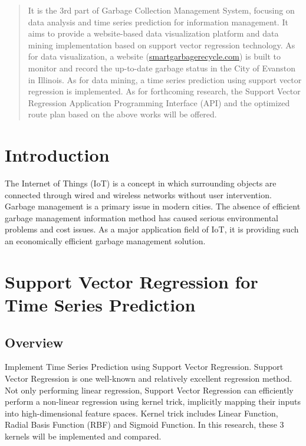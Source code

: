\documentclass[a0b,portrait]{a0poster}
\begin{document}
\begin{multicols}{3} %

\color{Navy} %

\begin{abstract}
\noindent{}It is the 3rd part of Garbage Collection Management System, focusing on data analysis and time series prediction for information management. It aims to provide a website-based data visualization platform and data mining implementation based on support vector regression technology. As for data visualization, a website (\href{http://smartgarbagerecycle.com/}{smartgarbagerecycle.com}) is built to monitor and record the up-to-date garbage status in the City of Evanston in Illinois. As for data mining, a time series prediction using support vector regression is implemented. As for forthcoming research, the Support Vector Regression Application Programming Interface (API) and the optimized route plan based on the above works will be offered.
\end{abstract}

\color{Black} %

\section*{Introduction}
The Internet of Things (IoT) is a concept in which surrounding objects are connected through wired and wireless networks without user intervention. Garbage management is a primary issue in modern cities. The absence of efficient garbage management information method has caused serious environmental problems and cost issues. As a major application field of IoT, it is providing such an economically efficient garbage management solution.

\color{Black} %
\section*{Support Vector Regression for Time Series Prediction}
\subsection*{Overview}
Implement Time Series Prediction using Support Vector Regression. Support Vector Regression is one well-known and relatively excellent regression method. Not only performing linear regression, Support Vector Regression can efficiently perform a non-linear regression using kernel trick, implicitly mapping their inputs into high-dimensional feature spaces. Kernel trick includes Linear Function, Radial Basis Function (RBF) and Sigmoid Function. In this research, these 3 kernels will be implemented and compared.

\end{multicols}
\end{document}
